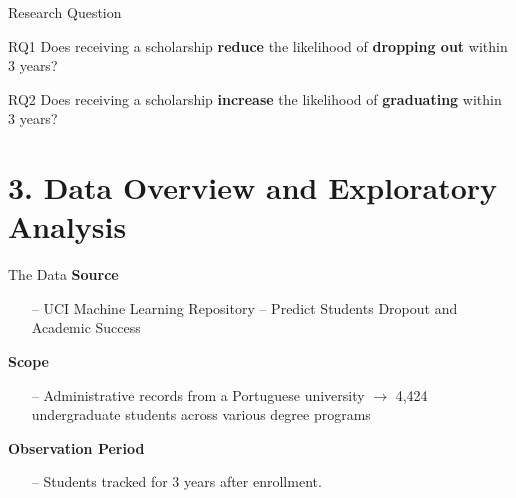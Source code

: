 \documentclass[aspectratio=169]{beamer}
\begin{document}
  
  \begin{frame}{Research Question}
    \begin{alertblock}{RQ1}
	Does receiving a scholarship \textbf{reduce} the likelihood of \textbf{dropping out} within 3 years?
\end{alertblock}
\vspace{10pt}
    \begin{alertblock}{RQ2}
	Does receiving a scholarship \textbf{increase} the likelihood of \textbf{graduating} within 3 years?
\end{alertblock}
  \end{frame}
  

\section{3. Data Overview and Exploratory Analysis}

\begin{frame}{The Data}
	\textbf{Source}
	\vspace{-8pt}
	\begin{itemize}
		\item [--] UCI Machine Learning Repository – Predict Students Dropout and Academic Success 
	\end{itemize}
	
	\textbf{Scope}
	\vspace{-8pt}
	\begin{itemize}
		\item [--] Administrative records from a Portuguese university $\rightarrow$ 4,424 undergraduate students across various degree programs
	\end{itemize}
	
	\textbf{Observation Period}
	\vspace{-8pt}
	\begin{itemize}
		\item [--] Students tracked for 3 years after enrollment.
	\end{itemize}
\end{frame}
\end{document}

